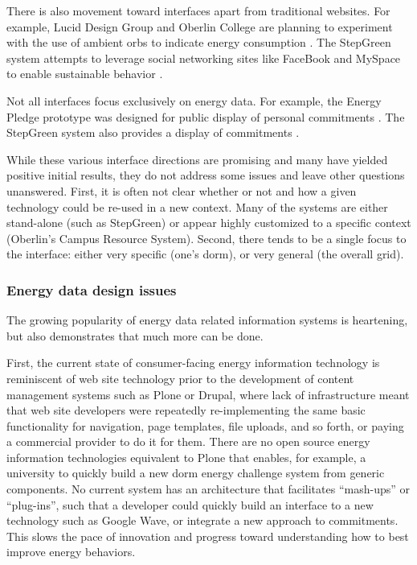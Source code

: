 There is also movement toward interfaces apart from traditional websites.
For example, Lucid Design Group and Oberlin College are planning to
experiment with the use of ambient orbs to indicate energy consumption
\cite{Peterson09}.  The StepGreen system attempts to leverage social
networking sites like FaceBook and MySpace to enable sustainable behavior
\cite{Mankoff07}.

Not all interfaces focus exclusively on energy data.  For example, the
Energy Pledge prototype was designed for public display of personal
commitments \cite{Pierce09}.  The StepGreen system also provides a display
of commitments \cite{StepGreen}.  

While these various interface directions are promising and many have
yielded positive initial results, they do not address some issues and leave
other questions unanswered. First, it is often not clear whether or not and
how a given technology could be re-used in a new context.  Many of the
systems are either stand-alone (such as StepGreen) or appear highly
customized to a specific context (Oberlin's Campus Resource
System). Second, there tends to be a single focus to the interface: either
very specific (one's dorm), or very general (the overall grid).  

\subsubsection{Energy data design issues}

The growing popularity of energy data related information systems is
heartening, but also demonstrates that much more can be done. 

First, the current state of consumer-facing energy information technology
is reminiscent of web site technology prior to the development of content
management systems such as Plone or Drupal, where lack of infrastructure
meant that web site developers were repeatedly re-implementing the same
basic functionality for navigation, page templates, file uploads, and so
forth, or paying a commercial provider to do it for them.  There are no
open source energy information technologies equivalent to Plone that
enables, for example, a university to quickly build a new dorm energy
challenge system from generic components.  No current system has an
architecture that facilitates ``mash-ups'' or ``plug-ins'', such that a
developer could quickly build an interface to a new technology such as
Google Wave, or integrate a new approach to commitments. This slows the
pace of innovation and progress toward understanding how to best improve
energy behaviors.

